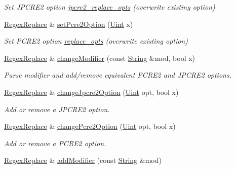 \begin{DoxyCompactItemize}
\begin{DoxyCompactList}\small\item\em Set J\+P\+C\+R\+E2 option \hyperlink{classjpcre2_1_1RegexReplace_acf13bcb16918df4b7bcaa7e49a1c7d59}{jpcre2\+\_\+replace\+\_\+opts} (overwrite existing option) \end{DoxyCompactList}\item 
\hyperlink{classjpcre2_1_1RegexReplace}{Regex\+Replace} \& \hyperlink{classjpcre2_1_1RegexReplace_aec36272d351fdc3a8cb02a4a3efea5a2}{set\+Pcre2\+Option} (\hyperlink{namespacejpcre2_a078242d38221a13fb3543b9edd78c099}{Uint} x)
\begin{DoxyCompactList}\small\item\em Set P\+C\+R\+E2 option \hyperlink{classjpcre2_1_1RegexReplace_afc79699cfcad8b7cbb26864b6b67cdc7}{replace\+\_\+opts} (overwrite existing option) \end{DoxyCompactList}\item 
\hyperlink{classjpcre2_1_1RegexReplace}{Regex\+Replace} \& \hyperlink{classjpcre2_1_1RegexReplace_ae58d2a44ed474568554202612d45c814}{change\+Modifier} (const \hyperlink{namespacejpcre2_a91f03070152fb228bc116c5a737f1d16}{String} \&mod, bool x)
\begin{DoxyCompactList}\small\item\em Parse modifier and add/remove equivalent P\+C\+R\+E2 and J\+P\+C\+R\+E2 options. \end{DoxyCompactList}\item 
\hyperlink{classjpcre2_1_1RegexReplace}{Regex\+Replace} \& \hyperlink{classjpcre2_1_1RegexReplace_afebf5e76bce8e312ab6dbdec3288b02b}{change\+Jpcre2\+Option} (\hyperlink{namespacejpcre2_a078242d38221a13fb3543b9edd78c099}{Uint} opt, bool x)
\begin{DoxyCompactList}\small\item\em Add or remove a J\+P\+C\+R\+E2 option. \end{DoxyCompactList}\item 
\hyperlink{classjpcre2_1_1RegexReplace}{Regex\+Replace} \& \hyperlink{classjpcre2_1_1RegexReplace_aea15c694bba7d994f048596a1f90f71f}{change\+Pcre2\+Option} (\hyperlink{namespacejpcre2_a078242d38221a13fb3543b9edd78c099}{Uint} opt, bool x)
\begin{DoxyCompactList}\small\item\em Add or remove a P\+C\+R\+E2 option. \end{DoxyCompactList}\item 
\hyperlink{classjpcre2_1_1RegexReplace}{Regex\+Replace} \& \hyperlink{classjpcre2_1_1RegexReplace_a06a57430f62058822d48722a2a6425d7}{add\+Modifier} (const \hyperlink{namespacejpcre2_a91f03070152fb228bc116c5a737f1d16}{String} \&mod)

\end{DoxyCompactItemize}
